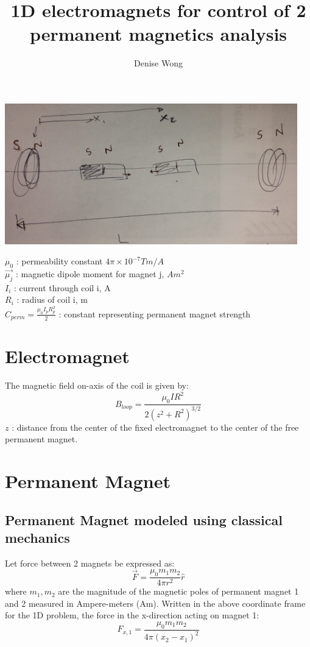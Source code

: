 \documentclass[english]{article}
\title{1D electromagnets for control of 2 permanent magnetics analysis}
\author{Denise Wong}
\begin{document}
\maketitle
\begin{center}
\includegraphics[width=5in]{1Dprobsetup.JPG}
\end{center}
$\mu_0$ : permeability constant $4\pi \times 10^{-7} Tm/A$\\
$\vec{\mu_j}$ : magnetic dipole moment for magnet j, $Am^2$\\
$I_i$ : current through coil i, A\\
$R_i$ : radius of coil i, m\\
$C_{perm} = \frac{\mu_0 I_p R_p^2}{2}$ : constant representing permanent magnet strength

\section*{Electromagnet}
The magnetic field on-axis of the coil is given by:
$${B}_{loop} = \frac{\mu_0 I R^2}{2\left(z^2 + R^2\right)^{3/2}}$$
${z}$ : distance from the center of the fixed electromagnet to the center of the free permanent magnet.  

\section*{Permanent Magnet}
\subsection*{Permanent Magnet modeled using classical mechanics}
Let force between 2 magnets be expressed as:
$$\vec{F} = \frac{\mu_0 m_1 m_2}{4 \pi r^2}\hat{r}$$
where $m_1,m_2$ are the magnitude of the magnetic poles of permanent magnet 1 and 2 measured in Ampere-meters (Am).  Written in the above coordinate frame for the 1D problem, the force in the x-direction acting on magnet 1:
$$F_{x,1} = \frac{\mu_0 m_1 m_2}{4 \pi \left(x_2-x_1\right)^2}$$
\end{document}
